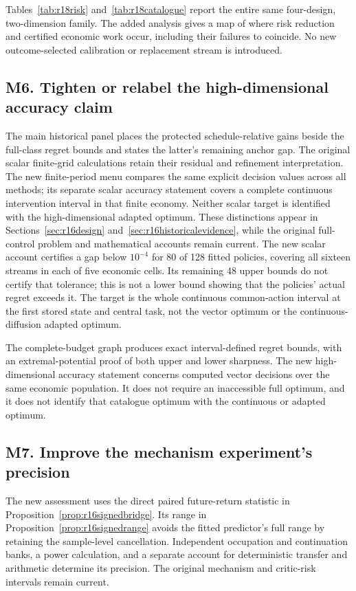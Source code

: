 Tables~\ref{tab:r18risk} and~\ref{tab:r18catalogue} report the entire same four-design, two-dimension family. The added analysis gives a map of where risk reduction and certified economic work occur, including their failures to coincide. No new outcome-selected calibration or replacement stream is introduced.

\subsection*{M6. Tighten or relabel the high-dimensional accuracy claim}\label{resp:M6}
The main historical panel places the protected schedule-relative gains beside the full-class regret bounds and states the latter's remaining anchor gap. The original scalar finite-grid calculations retain their residual and refinement interpretation. The new finite-period menu compares the same explicit decision values across all methods; its separate scalar accuracy statement covers a complete continuous intervention interval in that finite economy. Neither scalar target is identified with the high-dimensional adapted optimum. These distinctions appear in Sections~\ref{sec:r16design} and~\ref{sec:r16historicalevidence}, while the original full-control problem and mathematical accounts remain current. The new scalar account certifies a gap below $10^{-4}$ for 80 of 128 fitted policies, covering all sixteen streams in each of five economic cells. Its remaining 48 upper bounds do not certify that tolerance; this is not a lower bound showing that the policies' actual regret exceeds it. The target is the whole continuous common-action interval at the first stored state and central task, not the vector optimum or the continuous-diffusion adapted optimum.


The complete-budget graph produces exact interval-defined regret bounds, with an extremal-potential proof of both upper and lower sharpness. The new high-dimensional accuracy statement concerns computed vector decisions over the same economic population. It does not require an inaccessible full optimum, and it does not identify that catalogue optimum with the continuous or adapted optimum.

\subsection*{M7. Improve the mechanism experiment's precision}\label{resp:M7}
The new assessment uses the direct paired future-return statistic in Proposition~\ref{prop:r16signedbridge}. Its range in Proposition~\ref{prop:r16signedrange} avoids the fitted predictor's full range by retaining the sample-level cancellation. Independent occupation and continuation banks, a power calculation, and a separate account for deterministic transfer and arithmetic determine its precision. The original mechanism and critic-risk intervals remain current.

